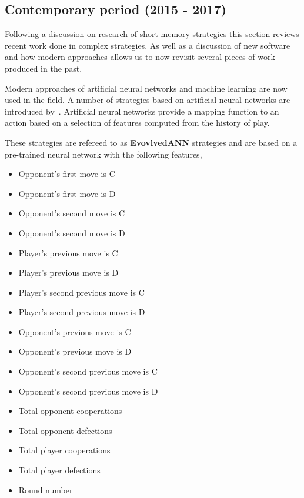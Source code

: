 \documentclass{article}
\begin{document}
\subsection{Contemporary period (2015 - 2017)}

Following a discussion on research of short memory strategies this section
reviews recent work done in complex strategies. As well as a discussion of
new software and how modern approaches allows us to now revisit several pieces of
work produced in the past.

Modern approaches of artificial neural networks and machine learning are now used
in the field.  A number of strategies based on artificial neural networks are
introduced by~\cite{Knight2017}. Artificial neural networks provide a mapping
function to an action based on a selection of features computed from the history
of play.
 
These strategies are refereed to as \textbf{EvovlvedANN} strategies and are
based on a pre-trained neural network with the following features,

\begin{multicols}{2}
    \begin{itemize}
        \item Opponent's first move is C
        \item Opponent's first move is D
        \item Opponent's second move is C
        \item Opponent's second move is D
        \item Player's previous move is C
        \item Player's previous move is D
        \item Player's second previous move is C
        \item Player's second previous move is D
        \item Opponent's previous move is C
        \item Opponent's previous move is D
        \item Opponent's second previous move is C
        \item Opponent's second previous move is D
        \item Total opponent cooperations
        \item Total opponent defections
        \item Total player cooperations
        \item Total player defections
        \item Round number
    \end{itemize}
\end{multicols}
\end{document}
